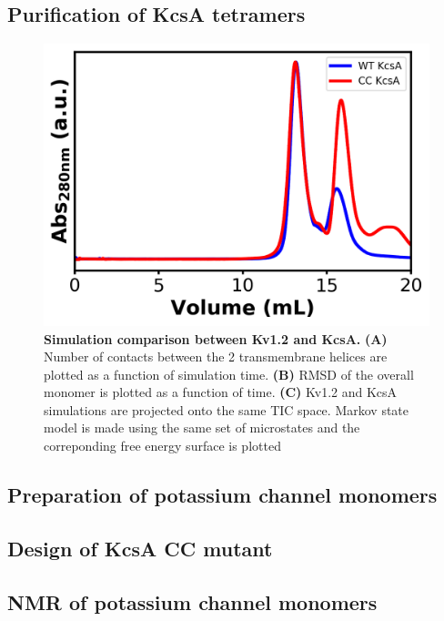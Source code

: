 \subsection{Purification of KcsA tetramers}
\begin{figure}[!ht]
\begin{center}
	\includegraphics[width=12cm]{figures/chapter3/sec.png}
\end{center}
	\caption{\textbf{Simulation comparison between Kv1.2 and KcsA.} \textbf{(A)} Number of contacts between the 2 transmembrane helices are plotted as a function of simulation time. \textbf{(B)} RMSD of the overall monomer is plotted as a function of time. \textbf{(C)} Kv1.2 and KcsA simulations are projected onto the same TIC space. Markov state model is made using the same set of microstates and the correponding free energy surface is plotted}
	\label{fig:ch3_f2}
\end{figure}

\subsection{Preparation of potassium channel monomers}



\subsection{Design of KcsA CC mutant}

\subsection{NMR of potassium channel monomers}

